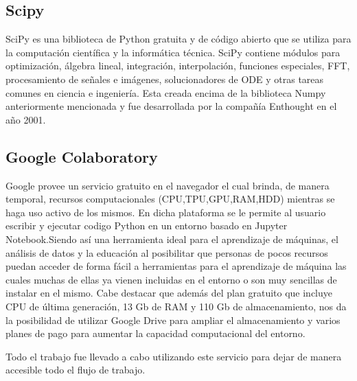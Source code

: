 \subsection{Scipy}
SciPy es una biblioteca de Python gratuita y de código abierto que se utiliza para la computación científica y la informática técnica. SciPy contiene módulos para optimización, álgebra lineal, integración, interpolación, funciones especiales, FFT, procesamiento de señales e imágenes, solucionadores de ODE y otras tareas comunes en ciencia e ingeniería. Esta creada encima de la biblioteca Numpy anteriormente mencionada y fue desarrollada por la compañía Enthought en el año 2001.

\subsection{Google Colaboratory}

Google provee un servicio gratuito en el navegador el cual brinda, de manera temporal, recursos computacionales (CPU,TPU,GPU,RAM,HDD) mientras se haga uso activo de los mismos. En dicha plataforma se le permite al usuario escribir y ejecutar codigo Python en un entorno basado en Jupyter Notebook.Siendo así una herramienta ideal para el aprendizaje de máquinas, el análisis de datos y la educación al posibilitar que personas de pocos recursos puedan acceder de forma fácil a herramientas para el aprendizaje de máquina las cuales muchas de ellas ya vienen incluidas en el entorno o son muy  sencillas de instalar en el mismo.
Cabe destacar que además del plan gratuito que incluye CPU de última generación, 13 Gb de RAM y 110 Gb de almacenamiento, nos da la posibilidad de utilizar Google Drive para ampliar el almacenamiento y  varios planes de pago para aumentar la capacidad computacional del entorno.
 
Todo el trabajo fue llevado a cabo utilizando este servicio para dejar de manera accesible todo el flujo de trabajo.


